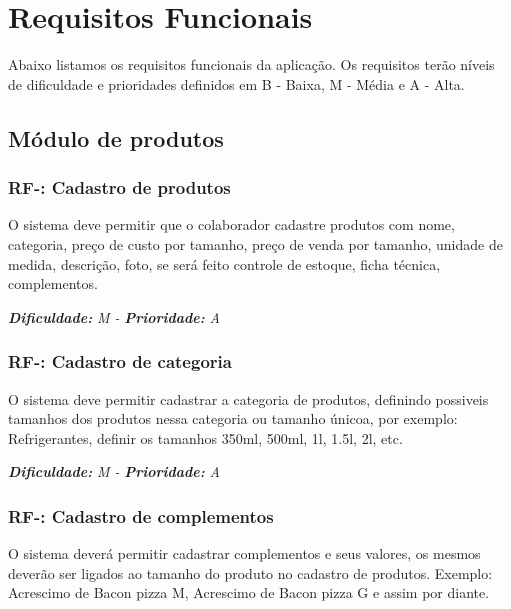 \pgfmathsetmacro{}
\chapter{Requisitos Funcionais}
Abaixo listamos os requisitos funcionais da aplicação\cite{Sommerville:2011}.
Os requisitos terão níveis de dificuldade e prioridades definidos em B - Baixa, M - Média e A - Alta.

\section{Módulo de produtos}
\vspace{0.5cm}

\pgfmathtruncatemacro{}
\subsection{RF-\nreq: Cadastro de produtos}
O sistema deve permitir que o colaborador cadastre produtos com nome, categoria, preço de custo por tamanho, preço de venda por tamanho, 
unidade de medida, descrição, foto, se será feito controle de estoque, ficha técnica, complementos.

\vspace{0.5cm}
\noindent\textbf{\textit{Dificuldade:}} \textit{M -} \textbf{\textit{Prioridade:}} \textit{A}
\vspace{0.5cm}
\pgfmathtruncatemacro{}
\subsection{RF-\nreq: Cadastro de categoria}
O sistema deve permitir cadastrar a categoria de produtos, definindo possiveis tamanhos dos produtos nessa categoria ou tamanho únicoa, por exemplo: Refrigerantes, definir os 
tamanhos 350ml, 500ml, 1l, 1.5l, 2l, etc.

\vspace{0.5cm}
\noindent\textbf{\textit{Dificuldade:}} \textit{M -} \textbf{\textit{Prioridade:}} \textit{A}
\vspace{0.5cm}
\pgfmathtruncatemacro{}
\subsection{RF-\nreq: Cadastro de complementos}
O sistema deverá permitir cadastrar complementos e seus valores, os mesmos deverão ser ligados ao tamanho do produto no cadastro de produtos.
Exemplo: Acrescimo de Bacon pizza M, Acrescimo de Bacon pizza G e assim por diante.


